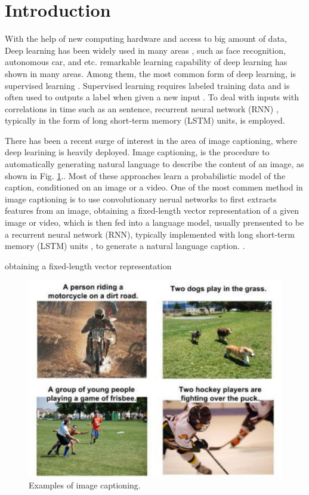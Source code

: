 \documentclass[conference]{IEEEtran}
\begin{document}
\IEEEpeerreviewmaketitle



\section{Introduction}

With the help of new computing hardware and access to big amount of data, Deep learning has been widely used in many areas \cite{krizhevsky2012imagenet}, such as face recognition, autonomous car, and etc. remarkable learning capability of deep learning has shown in many areas. Among them, the most common form of deep learning, is supervised learning \cite{lecun2015deep}. Supervised learning requires labeled training data and is often used to outputs a label when given a new input \cite{lecun1998gradient}. To deal with inputs with correlations in time such as an sentence, recurrent neural network (RNN) \cite{mikolov2010recurrent}, typically in the form of long short-term memory (LSTM) units, is employed.

There has been a recent surge of interest in the area of image captioning, where deep learining is heavily deployed. Image captioning, is the procedure to automatically generating natural language to describe the content of an image, as shown in Fig. \ref{cap_fig}.. Most of these approaches learn a probabilistic model of the caption, conditioned on an image or a video. One of the most commen method in image captioning is to use convolutionary nerual networks to first extracts features from an image, obtaining a fixed-length vector representation of a given image or video, which is then fed into a language model, usually prensented to be a recurrent neural network (RNN), typically implemented with long short-term memory (LSTM) units \cite{graves2013speech}, to generate a natural language caption. \cite{vinyals2015show}.

obtaining a fixed-length vector representation
\begin{figure}
  \centering
  \includegraphics[width=1.0\linewidth]{figures/caption.pdf}
  \caption{Examples of image captioning.}\label{cap_fig}
\end{figure}
\end{document}
